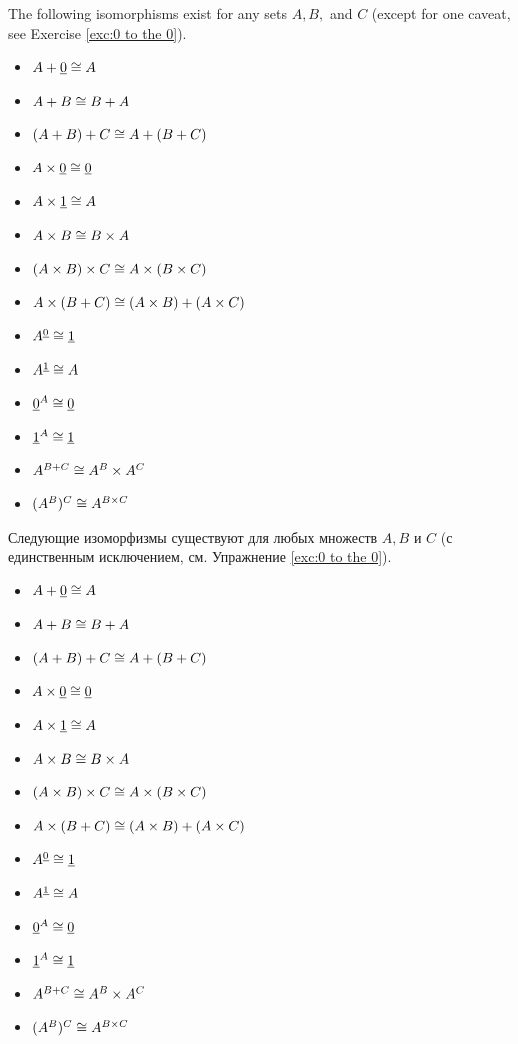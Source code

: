 \documentclass[CT4S-EN-RU]{subfiles}
\begin{document}
\begin{propositionENG}\label{prop:arithmetic of sets}
The following isomorphisms exist for any sets $A,B,$ and $C$ (except for one caveat, see Exercise \ref{exc:0 to the 0}). 
 
\begin{itemize}
\item $A+\underline{0}\cong A$
\item $A + B\cong B + A$
\item $(A + B) + C \cong A + (B + C)$
\item $A\times\underline{0}\cong\underline{0}$
\item $A\times\underline{1}\cong A$
\item $A\times B\cong B\times A$
\item $(A\times B)\times C \cong A\times (B\times C)$
\item $A\times(B+C)\cong (A\times B)+(A\times C)$
\item $A^{\underline{0}}\cong \underline{1}$
\item $A^{\underline{1}}\cong A$
\item $\underline{0}^A\cong\underline{0}$
\item $\underline{1}^A\cong\underline{1}$
\item $A^{B+C}\cong A^B\times A^C$
\item $(A^B)^C\cong A^{B\times C}$
\end{itemize}
\end{propositionENG}

\begin{propositionRUS}\label{prop:arithmetic of sets}
Следующие изоморфизмы существуют для любых множеств $A,B$ и $C$ (с единственным исключением, см. Упражнение \ref{exc:0 to the 0}). 
 
\begin{itemize}
\item $A+\underline{0}\cong A$
\item $A + B\cong B + A$
\item $(A + B) + C \cong A + (B + C)$
\item $A\times\underline{0}\cong\underline{0}$
\item $A\times\underline{1}\cong A$
\item $A\times B\cong B\times A$
\item $(A\times B)\times C \cong A\times (B\times C)$
\item $A\times(B+C)\cong (A\times B)+(A\times C)$
\item $A^{\underline{0}}\cong \underline{1}$
\item $A^{\underline{1}}\cong A$
\item $\underline{0}^A\cong\underline{0}$
\item $\underline{1}^A\cong\underline{1}$
\item $A^{B+C}\cong A^B\times A^C$
\item $(A^B)^C\cong A^{B\times C}$
\end{itemize}
\end{propositionRUS}
\end{document}
